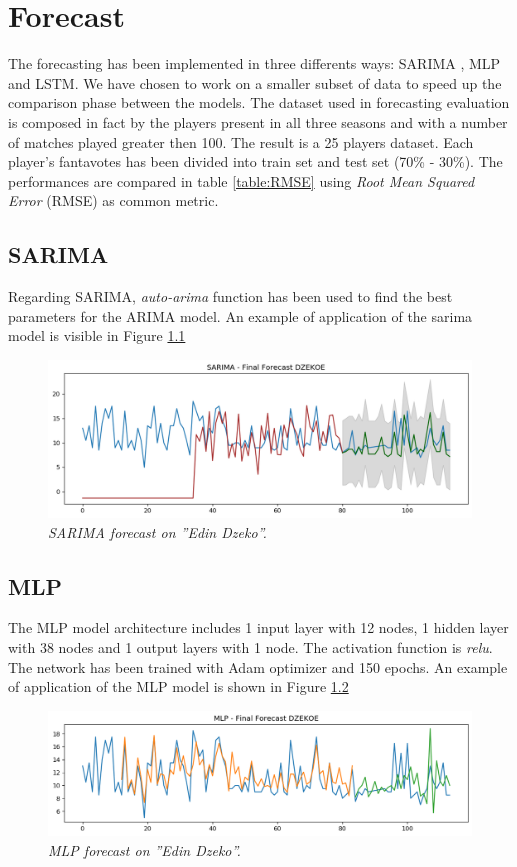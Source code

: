 \chapter {Forecast}

The forecasting has been implemented in three differents ways: SARIMA , MLP and LSTM.
We have chosen to work on a smaller subset of data to speed up the comparison phase between the models.
The dataset used in forecasting evaluation is composed in fact by the players present in all three seasons and with a number of matches played greater then 100.
The result is a 25 players dataset. 
Each player's fantavotes has been divided into train set and test set (70\% - 30\%).
The performances are compared in table \ref{table:RMSE} using \textit{Root Mean Squared Error} (RMSE) as common metric.

\section{SARIMA}

Regarding SARIMA, \textit{auto-arima} function has been used to find the best parameters for the ARIMA model.
An example of application of the sarima model is visible in Figure \ref{fig:sarima}


\begin{figure}[H]
  \includegraphics[scale=0.5]{images/dzeko_sarima_fantavoti.png}
   \centering  
   \caption{\textit{SARIMA forecast on ''Edin Dzeko''.}}
  \label{fig:sarima}
\end{figure}

\section{MLP}
The MLP model architecture includes 1 input layer with 12 nodes, 1 hidden layer with 38 nodes and 1 output layers with 1 node. The activation function is \textit{relu}.
The network has been trained with Adam optimizer and 150 epochs.
An example of application of the MLP model is shown in Figure \ref{fig:mlp}
\begin{figure}[H]
  \includegraphics[scale=0.5]{images/dzeko_mlp_fantavoti.png}
   \centering  
   \caption{\textit{MLP forecast on ''Edin Dzeko''.}}
  \label{fig:mlp}
\end{figure}

